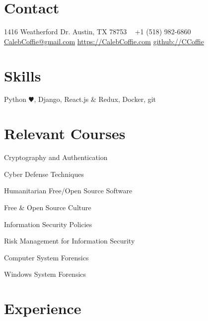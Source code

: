 \documentclass[]{CalebCoffie-CV-Class} %
\begin{document}


\begin{aside} %
\section{Contact}
1416 Weatherford Dr.
Austin, TX 78753
~
+1 (518) 982-6860
~
\href{mailto:CalebCoffie@gmail.com}{CalebCoffie@gmail.com}
\href{https://CalebCoffie.com}{https://CalebCoffie.com}
\href{https://github.com/CCoffie}{github://CCoffie}
\section{Skills}
Python {\color{black} $\varheartsuit$}, Django, React.js \& Redux, Docker, git
\section{Relevant Courses}
\item Cryptography and Authentication
\item Cyber Defense Techniques
\item Humanitarian Free/Open Source Software
\item Free \& Open Source Culture
\item Information Security Policies
\item Risk Management for Information Security
\item Computer System Forensics
\item Windows System Forensics
\end{aside}


\section{Experience}
\end{document}
